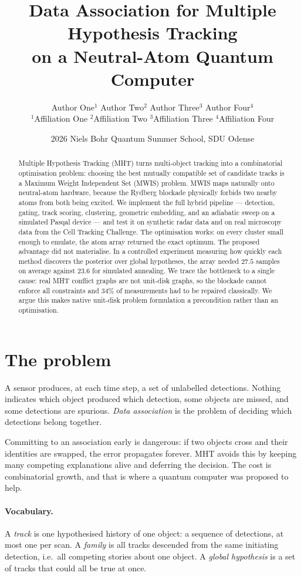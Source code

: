 \documentclass[10pt,twocolumn]{article}
\title{\bfseries Data Association for Multiple Hypothesis Tracking\\
       on a Neutral-Atom Quantum Computer}
\author{Author One$^{1}$ \quad Author Two$^{2}$ \quad
        Author Three$^{3}$ \quad Author Four$^{4}$ \\[2pt]
        \small $^{1}$Affiliation One \quad $^{2}$Affiliation Two \quad
        $^{3}$Affiliation Three \quad $^{4}$Affiliation Four}
\date{2026 Niels Bohr Quantum Summer School, SDU Odense}
\begin{document}
\maketitle

\begin{abstract}
\noindent
Multiple Hypothesis Tracking (MHT) turns multi-object tracking into a
combinatorial optimisation problem: choosing the best mutually compatible set of
candidate tracks is a Maximum Weight Independent Set (MWIS) problem. MWIS maps
naturally onto neutral-atom hardware, because the Rydberg blockade physically
forbids two nearby atoms from both being excited. We implement the full hybrid
pipeline --- detection, gating, track scoring, clustering, geometric embedding,
and an adiabatic sweep on a simulated Pasqal device --- and test it on synthetic
radar data and on real microscopy data from the Cell Tracking Challenge. The
optimisation works: on every cluster small enough to emulate, the atom array
returned the exact optimum. The proposed advantage did not materialise. In a
controlled experiment measuring how quickly each method discovers the posterior
over global hypotheses, the array needed $27.5$ samples on average against
$23.6$ for simulated annealing. We trace the bottleneck to a single cause:
real MHT conflict graphs are not unit-disk graphs, so the blockade cannot
enforce all constraints and $34\%$ of measurements had to be repaired
classically. We argue this makes native unit-disk problem formulation a
precondition rather than an optimisation.
\end{abstract}

\section{The problem}

A sensor produces, at each time step, a set of unlabelled detections. Nothing
indicates which object produced which detection, some objects are missed, and
some detections are spurious. \emph{Data association} is the problem of deciding
which detections belong together.

Committing to an association early is dangerous: if two objects cross and their
identities are swapped, the error propagates forever. MHT avoids this by keeping
many competing explanations alive and deferring the decision. The cost is
combinatorial growth, and that is where a quantum computer was proposed to help.

\paragraph{Vocabulary.} A \emph{track} is one hypothesised history of one
object: a sequence of detections, at most one per scan. A \emph{family} is all
tracks descended from the same initiating detection, i.e.\ all competing stories
about one object. A \emph{global hypothesis} is a set of tracks that
could all be true at once.
\end{document}

